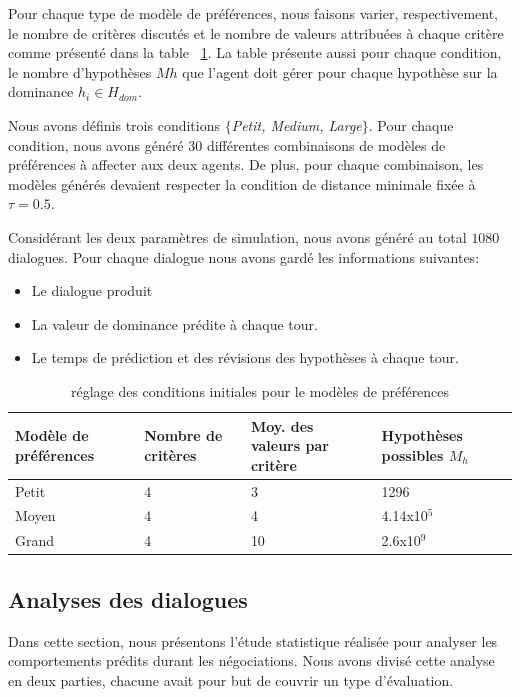 Pour chaque type de modèle de préférences, nous faisons varier, respectivement, le nombre de critères discutés et le nombre de valeurs attribuées à chaque critère comme présenté dans la table ~\ref {tab:initP}. La table présente aussi pour chaque condition, le nombre d'hypothèses $Mh$ que l'agent doit gérer pour chaque hypothèse sur la dominance $h_i \in H_{dom}$.

Nous avons définis trois conditions \emph {$\{$Petit, Medium, Large$\}$}.
Pour chaque condition, nous avons généré $ 30 $ différentes combinaisons de modèles de préférences à affecter aux deux agents. De plus, pour chaque combinaison, les modèles générés devaient respecter la condition de distance minimale fixée à $\tau =0.5$. 

Considérant les deux paramètres de simulation, nous avons généré au total $1080$ dialogues. Pour chaque dialogue nous avons gardé les informations suivantes:
\begin{itemize}
	\item Le dialogue produit
	\item La valeur de dominance prédite à chaque tour.
	\item Le temps de prédiction et des révisions des hypothèses à chaque tour.
	
\end{itemize} 



\begin{table}[]
	\caption{réglage des conditions initiales pour le modèles de préférences} 
	\centering
	\begin{tabular}{|p{2cm}|p{2cm}|p{2.65cm}|p{2.35cm}|}
		\hline 
		\textbf{Modèle de préférences } & Nombre de critères & Moy. des valeurs par critère & Hypothèses possibles $M_h$\\
		\hline
		Petit & 4 & 3 & 1296 \\
		\hline
		Moyen & 4 & 4 & 4.14x10$^5$ \\
		\hline
		Grand & 4 & 10 & 2.6x10$^9$ \\
		\hline
	\end{tabular}
	
	\label{tab:initP}
\end{table}

\subsection{Analyses des dialogues}
Dans cette section, nous présentons l'étude statistique réalisée pour analyser les comportements prédits durant les négociations.
Nous avons divisé cette analyse en deux parties, chacune avait pour but de couvrir un type d'évaluation.
 
